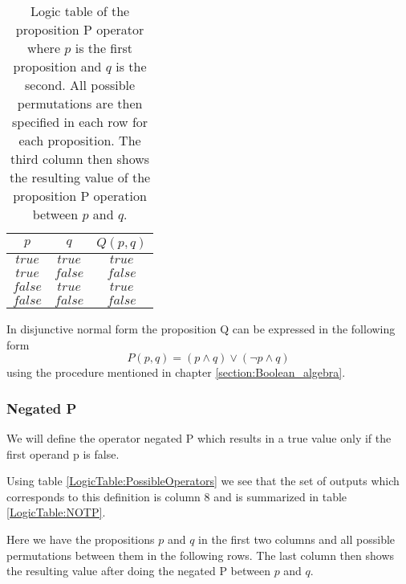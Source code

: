         \begin{table}[h!]
            \centering
            \begin{tabular}{|c|c|c|}
            	\hline
            	  $p$   &   $q$   & $Q(p, q)$ \\ \hline
            	$true$  & $true$  &  $true$   \\ \hline
            	$true$  & $false$ &  $false$  \\ \hline
            	$false$ & $true$  &  $true$   \\ \hline
            	$false$ & $false$ &  $false$  \\ \hline
            \end{tabular}
            \caption{Logic table of the proposition P operator where $p$ is the first proposition and $q$ is the second. All possible permutations are then specified in each row for each proposition. The third column then shows the resulting value of the proposition P operation between $p$ and $q$.}
            \label{LogicTable:Q}
        \end{table}
        
        In disjunctive normal form the proposition Q can be expressed in the following form
        \begin{equation}
            P(p, q) = (p \wedge q) \vee (\neg p \wedge  q)
        \end{equation}
        using the procedure mentioned in chapter \ref{section:Boolean_algebra}.
    
    \subsubsection{Negated P}
        We will define the operator negated P which results in a true value only if the first operand p is false.
        
        Using table \ref{LogicTable:PossibleOperators} we see that the set of outputs which corresponds to this definition is column 8 and is summarized in table \ref{LogicTable:NOTP}.
        
        Here we have the propositions $p$ and $q$ in the first two columns and all possible permutations between them in the following rows. The last column then shows the resulting value after doing the negated P between $p$ and $q$.
        

